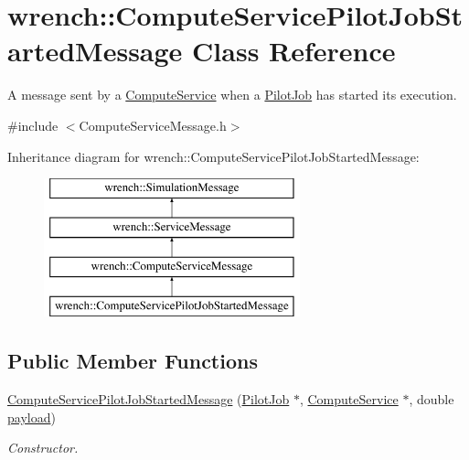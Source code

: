 \hypertarget{classwrench_1_1_compute_service_pilot_job_started_message}{}\section{wrench\+:\+:Compute\+Service\+Pilot\+Job\+Started\+Message Class Reference}
\label{classwrench_1_1_compute_service_pilot_job_started_message}


A message sent by a \hyperlink{classwrench_1_1_compute_service}{Compute\+Service} when a \hyperlink{classwrench_1_1_pilot_job}{Pilot\+Job} has started its execution.  




{\ttfamily \#include $<$Compute\+Service\+Message.\+h$>$}

Inheritance diagram for wrench\+:\+:Compute\+Service\+Pilot\+Job\+Started\+Message\+:\begin{figure}[H]
\begin{center}
\leavevmode
\includegraphics[height=4.000000cm]{classwrench_1_1_compute_service_pilot_job_started_message}
\end{center}
\end{figure}
\subsection*{Public Member Functions}
\begin{DoxyCompactItemize}
\item 
\hyperlink{classwrench_1_1_compute_service_pilot_job_started_message_a97ab9e85523c207b9339cf7fca063b8c}{Compute\+Service\+Pilot\+Job\+Started\+Message} (\hyperlink{classwrench_1_1_pilot_job}{Pilot\+Job} $\ast$, \hyperlink{classwrench_1_1_compute_service}{Compute\+Service} $\ast$, double \hyperlink{classwrench_1_1_simulation_message_a914f2732713f7c02898e66f05a7cb8a1}{payload})
\begin{DoxyCompactList}\small\item\em Constructor. \end{DoxyCompactList}\end{DoxyCompactItemize}
